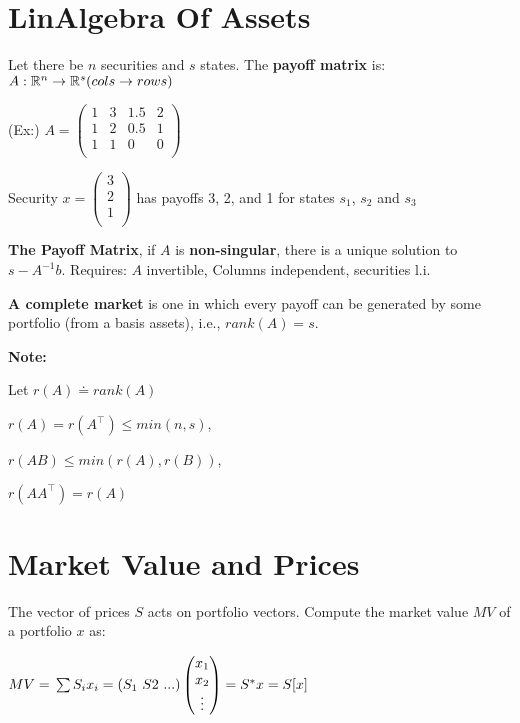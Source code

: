 \section{LinAlgebra Of Assets}

Let there be $n$ securities and $s$ states. The \textbf{payoff matrix} is: $A: \mathbb{R}^n \to \mathbb{R}^s \\ (cols \to rows)$ 

(Ex:) $A = \begin{pmatrix}
    1 & 3 & 1.5 & 2\\
    1 & 2 & 0.5 & 1\\
    1 & 1 & 0 & 0\\
\end{pmatrix}$ 
    
Security $x = \begin{pmatrix} 3 \\ 2 \\ 1 \\\end{pmatrix}$ has payoffs 3, 2, and 1 for states $s_1$, $s_2$ and $s_3$

\textbf{The Payoff Matrix}, if $A$ is \textbf{non-singular}, there is a unique solution to $s - A^{-1}b$. Requires: $A$ invertible, Columns independent, securities l.i.

\textbf{A complete market} is one in which every payoff can be generated by some portfolio (from a basis assets), i.e., $rank(A) = s$.

\textbf{Note:}

Let $r(A) \doteq rank(A)$

$r(A) = r(A^\top) \leq min(n,s)$,

$r(AB) \leq min(r(A), r(B))$, 

$r(AA^\top) = r(A)$

\section{Market Value and Prices}

The vector of prices $S$ acts on portfolio vectors. Compute the market value $MV$ of a portfolio $x$ as:

$MV= \\ \sum S_i x_i = (S_1\text{ }S2\text{ } ...) \begin{pmatrix} x_1 \\ x_2 \\ \vdots \end{pmatrix} = S^* x = S[x]$

